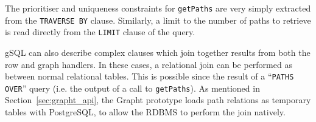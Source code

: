 The prioritiser and uniqueness constraints for \texttt{getPaths} are very
simply extracted from the \texttt{TRAVERSE BY} clause. Similarly, a limit  to
the number of paths to retrieve is read directly from the \texttt{LIMIT}
clause of the query.

gSQL can also describe complex clauses which join together results from both the row and graph handlers.
In these cases, a relational join can be performed as between normal relational
tables. This is possible since the result of a ``\texttt{PATHS OVER}'' query
(i.e. the output of a call to \texttt{getPaths}). As mentioned in Section~\ref{sec:grapht_api}, 
the Grapht prototype loads path relations as temporary tables with PostgreSQL, to allow the RDBMS to perform the join natively.

